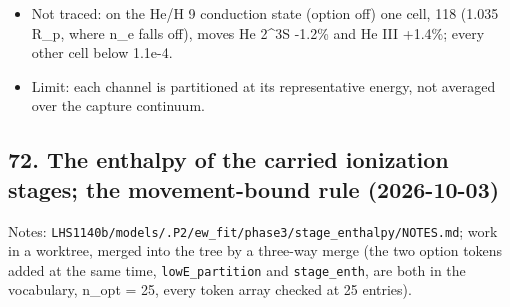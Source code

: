 \documentclass[english,a4paper]{my_memo}
\begin{document}
\begin{itemize}
  switched on in these snapshots); with \texttt{Secondary\_ionization:\ Immediate}:
  wasp\_full heat -5.3e-5, T -2.7e-5, x(H+) +3.4e-5 at 1.036-1.041 R\_p
  (the He recombination heating channel itself -0.23\%); hp\_front below 1e-7.
  The certified He/H 2.09 transport state: wind energy row 8.4e-16 -\textgreater{}
  1.3e-11, gated H+ row 1.6e-8 -\textgreater{} 3.3e-8, far below tolerance.
\item
  Not traced: on the He/H 9 conduction state (option off) one cell, 118
  (1.035 R\_p, where n\_e falls off), moves He 2\^{}3S -1.2\% and He III +1.4\%;
  every other cell below 1.1e-4.
\item
  Limit: each channel is partitioned at its representative energy, not
  averaged over the capture continuum.
\end{itemize}

\subsection{72. The enthalpy of the carried ionization stages; the movement-bound rule (2026-10-03)}\label{72-the-enthalpy-of-the-carried-ionization-stages-the-movement-bound-rule-2026-10-03}

Notes: \texttt{LHS1140b/models/.P2/ew\_fit/phase3/stage\_enthalpy/NOTES.md}; work in
a worktree, merged into the tree by a three-way merge (the two option tokens
added at the same time, \texttt{lowE\_partition} and \texttt{stage\_enth}, are both in the
vocabulary, n\_opt = 25, every token array checked at 25 entries).
\end{document}
